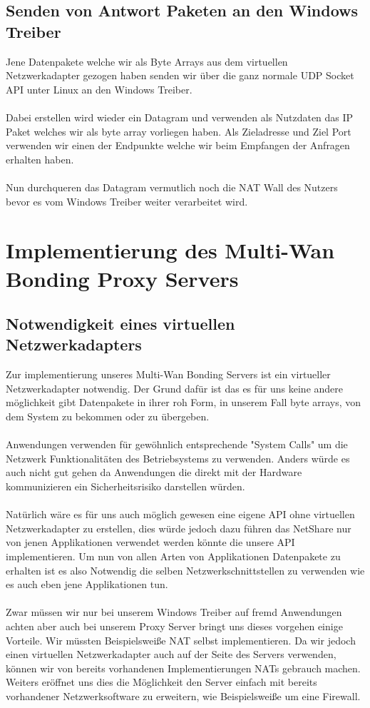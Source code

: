 \subsection{Senden von Antwort Paketen an den Windows Treiber}
Jene Datenpakete welche wir als Byte Arrays aus dem virtuellen Netzwerkadapter gezogen haben senden wir über die ganz normale UDP Socket API unter Linux an den Windows Treiber. 
\\\\
Dabei erstellen wird wieder ein Datagram und verwenden als Nutzdaten das IP Paket welches wir als byte array vorliegen haben. Als Zieladresse und Ziel Port verwenden wir einen der Endpunkte welche wir beim Empfangen der Anfragen erhalten haben.
\\\\
Nun durchqueren das Datagram vermutlich noch die NAT Wall des Nutzers bevor es vom Windows Treiber weiter verarbeitet wird. 


\section{Implementierung des Multi-Wan Bonding Proxy Servers}
\subsection{Notwendigkeit eines virtuellen Netzwerkadapters}
Zur implementierung unseres Multi-Wan Bonding Servers ist ein virtueller Netzwerkadapter notwendig. Der Grund dafür ist das es für uns keine andere möglichkeit gibt Datenpakete in ihrer roh Form, in unserem Fall byte arrays, von dem System zu bekommen oder zu übergeben. 
\\\\
Anwendungen verwenden für gewöhnlich entsprechende "System Calls" um die Netzwerk Funktionalitäten des Betriebsystems zu verwenden. Anders würde es auch nicht gut gehen da Anwendungen die direkt mit der Hardware kommunizieren ein Sicherheitsrisiko darstellen würden.
\\\\
Natürlich wäre es für uns auch möglich gewesen eine eigene API ohne virtuellen Netzwerkadapter zu erstellen, dies würde jedoch dazu führen das NetShare nur von jenen Applikationen verwendet werden könnte die unsere API implementieren. Um nun von allen Arten von Applikationen Datenpakete zu erhalten ist es also Notwendig die selben Netzwerkschnittstellen zu verwenden wie es auch eben jene Applikationen tun.  
\\\\
Zwar müssen wir nur bei unserem Windows Treiber auf fremd Anwendungen achten aber auch bei unserem Proxy Server bringt uns dieses vorgehen einige Vorteile. Wir müssten Beispielsweiße NAT selbst implementieren. Da wir jedoch einen virtuellen Netzwerkadapter auch auf der Seite des Servers verwenden, können wir von bereits vorhandenen Implementierungen NATs gebrauch machen. Weiters eröffnet uns dies die Möglichkeit den Server einfach mit bereits vorhandener Netzwerksoftware zu erweitern, wie Beispielsweiße um eine Firewall.
